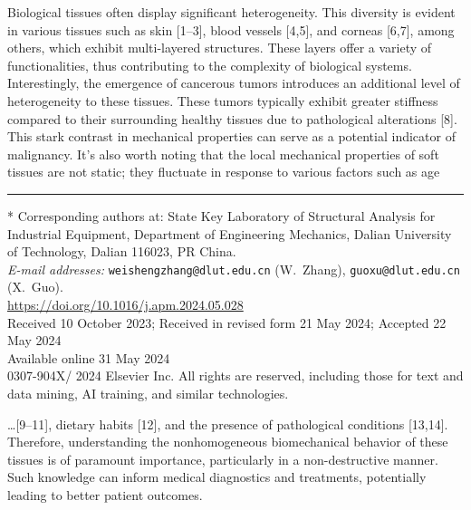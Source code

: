 \documentclass[11pt]{article}
\begin{document}
\noindent
Biological tissues often display significant heterogeneity. This
diversity is evident in various tissues such as skin [1--3], blood
vessels [4,5], and corneas [6,7], among others, which exhibit
multi-layered structures. These layers offer a variety of
functionalities, thus contributing to the complexity of biological
systems. Interestingly, the emergence of cancerous tumors introduces
an additional level of heterogeneity to these tissues. These tumors
typically exhibit greater stiffness compared to their surrounding
healthy tissues due to pathological alterations [8]. This stark
contrast in mechanical properties can serve as a potential indicator
of malignancy. It's also worth noting that the local mechanical
properties of soft tissues are not static; they fluctuate in response
to various factors such as age

\vfill
\hrule
\vspace{0.4em}
\noindent
{\footnotesize
* Corresponding authors at: State Key Laboratory of Structural
Analysis for Industrial Equipment, Department of Engineering
Mechanics, Dalian University of Technology, Dalian 116023, PR China.\\[2pt]
\textit{E-mail addresses:}
\texttt{weishengzhang@dlut.edu.cn} (W.~Zhang),
\texttt{guoxu@dlut.edu.cn} (X.~Guo).\\[4pt]
\url{https://doi.org/10.1016/j.apm.2024.05.028}\\[2pt]
Received 10 October 2023; Received in revised form 21 May 2024;
Accepted 22 May 2024\\[2pt]
Available online 31 May 2024\\[2pt]
0307-904X/\textcopyright{} 2024 Elsevier Inc. All rights are reserved,
including those for text and data mining, AI training, and similar
technologies.\par}

\newpage


\noindent
\ldots{}[9--11], dietary habits [12], and the presence of pathological
conditions [13,14]. Therefore, understanding the nonhomogeneous
biomechanical behavior of these tissues is of paramount importance,
particularly in a non-destructive manner. Such knowledge can inform
medical diagnostics and treatments, potentially leading to better
patient outcomes.
\end{document}
